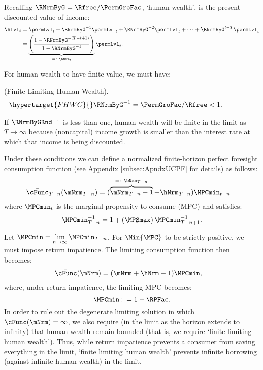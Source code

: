 \documentclass[BufferStockTheory]{subfiles}
\begin{document}
Recalling $\RNrmByG  = \Rfree/\PermGroFac$, `human wealth', is the present discounted value of income:
%
% 
\begin{align}
  \hLvl_{t}  & = \permLvl_{t}+\RNrmByG^{-1} \permLvl_{t} + \RNrmByG^{-2} \permLvl_{t} + \cdots + \RNrmByG^{t-T} \permLvl_{t} \notag
  \\  & = \underbrace{\left(\frac{1-\RNrmByG^{-(T-t+1)}}{1-\RNrmByG^{-1}}\right)}_{ = \colon \hNrm_{t}}\permLvl_{t} \label{eq:HDef}.
\end{align}

For human wealth to have finite value, we must have:
%
\begin{assumI}\label{ass:FHWC}(Finite Limiting Human Wealth).
\begin{align}\hypertarget{FHWC}{}
   \RNrmByG^{-1} = \PermGroFac/\Rfree  & < 1. \phantom{\text{{\FHWC}:~~}}\label{eq:FHWC2}
\end{align}
\end{assumI}
%
If $\RNrmByGRnd^{-1}$ is less than one, human wealth will be finite in the limit as $T \rightarrow \infty$ because (noncapital) income growth is smaller than the interest rate at which that income is being discounted.

Under these conditions we can define a normalized finite-horizon perfect foresight consumption function (see Appendix \ref{subsec:ApndxUCPF} for details) as follows:\hypertarget{MPCminDefn}{}
%
\begin{align*}
  \bar{\cFunc}_{T-n}(\mNrm_{T-n})  & = (\overbrace{\mNrm_{T-n}-1}^{
                                     = \colon  \bNrm_{T-n}}+\hNrm_{T-n})\MPCmin_{t-n}
\end{align*}
%
where $\MPCmin_{t}$ is the marginal propensity to consume (MPC) and satisfies:
%
\begin{align}\label{eq:PFMPCminInv}
\MPCmin_{T-n}^{-1}  = 1+\left(\MPSmax\right) \MPCmin_{T-n+1}^{-1}.
\end{align}
%

Let $\MPCmin = \lim\limits_{n\rightarrow\infty}\MPCmin_{T-n}$.
For $\Min{\MPC}$ to be strictly positive, we must impose \hyperlink{RIC}{return impatience}.
The limiting consumption function then becomes:
%
\begin{align}\label{eq:cFuncPFUnc}
  \bar{\cFunc}(\mNrm)  & = (\mNrm+\hNrm-1)\MPCmin,
\end{align}
%
where, under return impatience, the limiting MPC becomes:
%
%
\begin{equation}\label{eq:MPCminDef}
\MPCmin \colon = 1-\RPFac.
\end{equation}
%
%
%
In order to rule out the degenerate limiting solution in which $\bar{\cFunc}(\mNrm) = \infty$, we also require (in the limit as the horizon extends to infinity) that human wealth remain bounded (that is, we require \hyperlink{FHWC}{`finite limiting human wealth'}).
Thus, while \hyperlink{RIC}{return impatience} prevents a consumer from saving everything in the limit,  \hyperlink{FHWC}{`finite limiting  human wealth'} prevents infinite borrowing (against infinite human wealth) in the limit.
\end{document}
